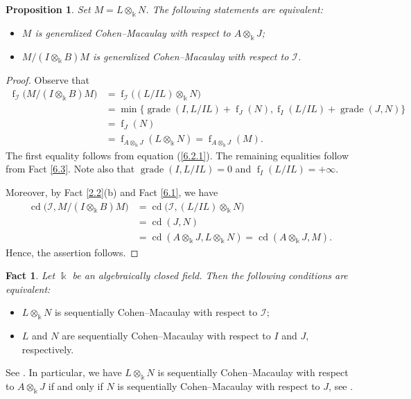 \documentclass[10pt,a4paper]{amsart}
\numberwithin{equation}{theorem}
\newtheorem{proposition}[theorem]{Proposition}
\theoremstyle{definition}
\theoremstyle{fact}
\newtheorem{fact}[theorem]{Fact}
\theoremstyle{conjecture}
\newcommand{\f}{\operatorname{f}}
\newcommand{\grade}{\operatorname{grade}}
\newcommand{\cd}{\operatorname{cd}}
\begin{document}
\begin{proposition}
\label{6.4}
Set $M=L\otimes_\Bbbk N$. The following statements are equivalent:
\begin{itemize}
\item[(a)] $M$ is generalized Cohen--Macaulay with respect to
$A\otimes_\Bbbk J$;
\item[(b)] $M/(I\otimes_\Bbbk B)M$ is generalized Cohen--Macaulay
with respect to $\mathcal{I}$.
\end{itemize}
\end{proposition}

\begin{proof}
Observe that
\begin{align*}
\f_{\mathcal{I}}\big(M/(I\otimes_\Bbbk B)M\big)
&=\f_{\mathcal{I}}\big((L/IL)\otimes_\Bbbk N\big)\\
&=\min\big\{
\grade(I,L/IL)+\f_J(N),
\f_I(L/IL)+\grade(J,N)
\big\}\\
&=\f_J(N)\\
&=\f_{A\otimes_\Bbbk J}(L\otimes_\Bbbk N)=\f_{A\otimes_\Bbbk J}(M).
\end{align*}
The first equality follows from equation (\ref{6.2.1}). The remaining equalities follow from Fact \ref{6.3}. Note also that $\grade(I,L/IL)=0$ and $\f_I(L/IL)=+\infty$.

Moreover, by Fact \ref{2.2}(b) and Fact \ref{6.1}, we have
\[
\begin{aligned}
\cd\big(\mathcal{I}, M/(I\otimes_\Bbbk B)M\big)
&=\cd\big(\mathcal{I},(L/IL)\otimes_\Bbbk N\big)\\
&=\cd(J,N)\\
&=\cd(A\otimes_\Bbbk J, L\otimes_\Bbbk N)=\cd(A\otimes_\Bbbk J, M).
\end{aligned}
\]
 Hence, the assertion follows.
\end{proof}


\vspace{.2cm}
\vspace{.3cm}
\begin{fact}{\em
\label{6.5}
Let $\Bbbk$ be an algebraically closed field. Then the following conditions are equivalent:
 \begin{itemize}
\item[{(a)}] $L\otimes_{\Bbbk} N$ is sequentially Cohen--Macaulay with respect to $\mathcal{I}$;
\item[{(b)}] $L$ and $N$ are sequentially Cohen--Macaulay with respect to $I$ and $J$, respectively.
\end{itemize}
See \cite[Theorem 4.6]{R4}.
In particular, we have  $L\otimes_\Bbbk N$ is sequentially Cohen--Macaulay with respect
to $A \otimes_\Bbbk J$ if and only if $N$ is sequentially Cohen--Macaulay with respect to $J$,
see \cite[Corollary 4.7]{R4}.
 }
\end{fact}
\end{document}
